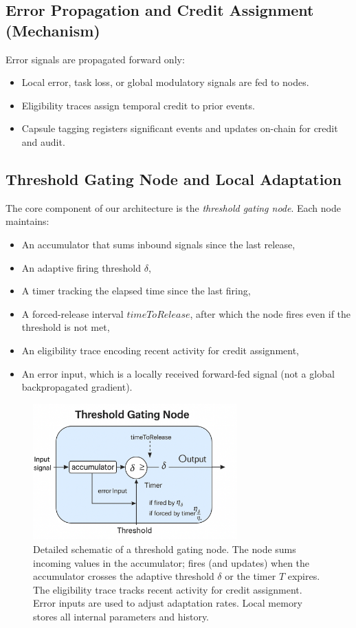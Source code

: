 \documentclass[11pt]{article}
\begin{document}
\subsection{Error Propagation and Credit Assignment (Mechanism)}

Error signals are propagated forward only:
\begin{itemize}
    \item Local error, task loss, or global modulatory signals are fed to nodes.
    \item Eligibility traces assign temporal credit to prior events.
    \item Capsule tagging registers significant events and updates on-chain for credit and audit.
\end{itemize}

\subsection{Threshold Gating Node and Local Adaptation}
The core component of our architecture is the \emph{threshold gating node}. Each node maintains:
\begin{itemize}
    \item An accumulator that sums inbound signals since the last release,
    \item An adaptive firing threshold \(\delta\),
    \item A timer tracking the elapsed time since the last firing,
    \item A forced-release interval \(timeToRelease\), after which the node fires even if the threshold is not met,
    \item An eligibility trace encoding recent activity for credit assignment,
    \item An error input, which is a locally received forward-fed signal (not a global backpropagated gradient).
\end{itemize}
\begin{figure}[ht]
    \centering
    \includegraphics[width=0.7\textwidth]{architecture_diagrams/1fe38644-c569-4658-b345-f5d0ddced01b.png}
    \caption{
        Detailed schematic of a threshold gating node. The node sums incoming values in the accumulator; fires (and updates) when the accumulator crosses the adaptive threshold \(\delta\) or the timer \(T\) expires. The eligibility trace tracks recent activity for credit assignment. Error inputs are used to adjust adaptation rates. Local memory stores all internal parameters and history.
    }
    \label{fig:threshold-gating-node}
\end{figure}
\end{document}
